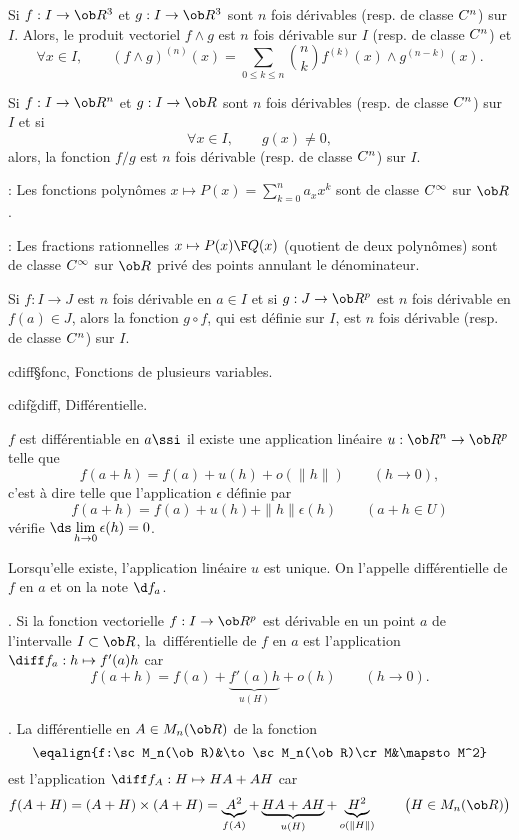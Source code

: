 \Theoreme [$I$ intervalle, $n\in\ob N$]
Si $f:I\to\ob R^3$ et $g:I\to\ob R^3$ sont $n$ fois d\'erivables (resp. de classe $\sc C^n$) sur $I$. 
Alors, le produit vectoriel $f\wedge g$ est $n$ fois d\'erivable sur $I$ (resp. de classe $\sc C^n$) et 
$$
\forall x\in I, \qquad (f\wedge g)^{(n)}(x)=\sum_{0\le k\le n}{n\choose k}f^{(k)}(x)\wedge g^{(n-k)}(x).
$$


Si $f:I\to\ob R^n$ et $g:I\to\ob R$ sont $n$ fois d\'erivables (resp. de classe $\sc C^n$) sur $I$ et si 
$$
\forall x\in I, \qquad g(x)\neq 0,
$$ 
alors, la fonction $f/g$ est $n$ fois d\'erivable (resp. de classe $\sc C^n$) sur $I$. 

\Remarque : Les fonctions polyn\^omes $x\mapsto P(x)=\sum_{k=0}^n a_xx^k$ sont de classe $\sc C^\infty$ 
sur $\ob R$. 
\bigskip

\Remarque  : Les fractions rationnelles $x\mapsto {P(x)\F Q(x)}$ (quotient de deux polyn\^omes) sont de classe $\sc C^\infty$ sur $\ob R$ priv\'e des points annulant le d\'enominateur. 
\bigskip

\Theoreme [$I$ et $J$ intervalles] 
Si $f:I\to J$ est $n$ fois d\'erivable en $a\in I$ et si $g:J\to\ob R^p$ est $n$ fois d\'erivable en $f(a)\in J$, 
alors la fonction $g\circ f$, qui est d\'efinie sur $I$, est $n$ fois d\'erivable (resp. de classe $\sc C^n$) sur $I$. 

\Section cdiff§fonc, Fonctions de plusieurs variables. 

\Subsection cdifǧdiff, Diff\'erentielle.

\Definition [$U$ ouvert de $\ob R^n$, $f:U\to\ob R^p$, $a\in U$] 
$f$ est diff\'erentiable en $a\ssi$ il existe une application lin\'eaire $u:\ob R^n\to\ob R^p$ telle que 
$$
f(a+h)=f(a)+u(h)+o(\|h\|)\qquad(h\to0), 
$$
c'est \`a dire telle que l'application $\epsilon$ d\'efinie par 
$$
f(a+h)=f(a)+u(h)+\|h\|\epsilon(h)\qquad(a+h\in U)
$$ 
v\'erifie $\ds\lim\limits_{h\to0}\epsilon(h)=0$. 

\Propriete Lorsqu'elle existe, l'application lin\'eaire $u$ est unique. On l'appelle diff\'erentielle de $f$ en $a$ et on la note $\d f_a$. 


\Exemple. Si la fonction vectorielle $f:I\to\ob R^p$ est d\'erivable en un point $a$ de l'intervalle $I\subset\ob R$, la~diff\'erentielle de $f$ en $a$ est l'application $\diff f_a:h\mapsto f'(a)h$ car 
$$
f(a+h)=f(a)+\underbrace{f'(a)h}_{u(H)}+o(h)\qquad(h\to 0). 
$$


\Exemple. La diff\'erentielle en $A\in\sc M_n(\ob R)$ de la fonction
$$
\eqalign{f:\sc M_n(\ob R)&\to\sc M_n(\ob R)\cr
M&\mapsto M^2}
$$
est l'application $\diff f_A:H\mapsto HA+AH$ car 
$$
f(A+H)=(A+H)\times(A+H)=\underbrace{A^2}_{f(A)}+\underbrace{HA+AH}_{u(H)}
+\underbrace{H^2}_{o(\|H\|)}\qquad\big(H\in\sc M_n(\ob R)\big)
$$


